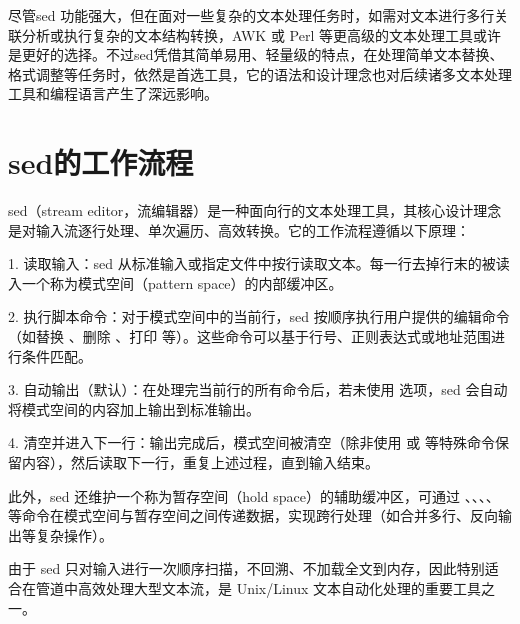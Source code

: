 尽管sed 功能强大，但在面对一些复杂的文本处理任务时，如需对文本进行多行关联分析或执行复杂的文本结构转换，AWK 或 Perl 等更高级的文本处理工具或许是更好的选择。不过sed凭借其简单易用、轻量级的特点，在处理简单文本替换、格式调整等任务时，依然是首选工具，它的语法和设计理念也对后续诸多文本处理工具和编程语言产生了深远影响。

\section{sed的工作流程}
sed（stream editor，流编辑器）是一种面向行的文本处理工具，其核心设计理念是对输入流逐行处理、单次遍历、高效转换。它的工作流程遵循以下原理：

1. 读取输入：sed 从标准输入或指定文件中按行读取文本。每一行去掉行末的\shellinline{\n}被读入一个称为模式空间（pattern space）的内部缓冲区。

2. 执行脚本命令：对于模式空间中的当前行，sed 按顺序执行用户提供的编辑命令（如替换 、删除
、打印  等）。这些命令可以基于行号、正则表达式或地址范围进行条件匹配。

3. 自动输出（默认）：在处理完当前行的所有命令后，若未使用  选项，sed
会自动将模式空间的内容加上\shellinline{\n}输出到标准输出。

4. 清空并进入下一行：输出完成后，模式空间被清空（除非使用  或  等特殊命令保留内容），然后读取下一行，重复上述过程，直到输入结束。

此外，sed 还维护一个称为暂存空间（hold space）的辅助缓冲区，可通过
、、、、 等命令在模式空间与暂存空间之间传递数据，实现跨行处理（如合并多行、反向输出等复杂操作）。

由于 sed 只对输入进行一次顺序扫描，不回溯、不加载全文到内存，因此特别适合在管道中高效处理大型文本流，是 Unix/Linux 文本自动化处理的重要工具之一。

